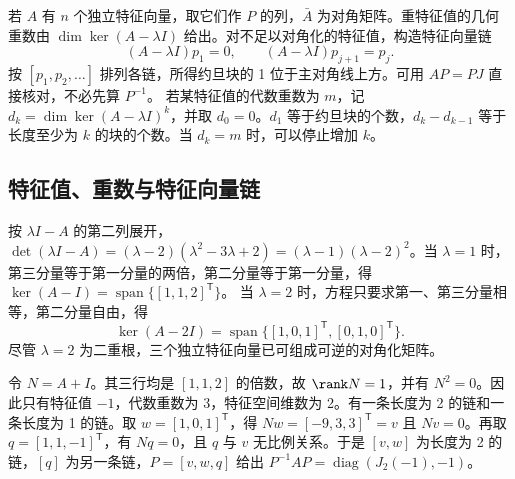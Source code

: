 
若 $A$ 有 $n$ 个独立特征向量，取它们作 $P$ 的列，$\bar A$ 为对角矩阵。重特征值的几何重数由 $\dim\ker(A-\lambda I)$ 给出。对不足以对角化的特征值，构造特征向量链
\[
(A-\lambda I)p_1=0,\qquad
(A-\lambda I)p_{j+1}=p_j.
\]
按 $[p_1,p_2,\ldots]$ 排列各链，所得约旦块的 1 位于主对角线上方。可用 $AP=PJ$ 直接核对，不必先算 $P^{-1}$。
若某特征值的代数重数为 $m$，记 $d_k=\dim\ker(A-\lambda I)^k$，并取 $d_0=0$。$d_1$ 等于约旦块的个数，$d_k-d_{k-1}$ 等于长度至少为 $k$ 的块的个数。当 $d_k=m$ 时，可以停止增加 $k$。

\subsection{特征值、重数与特征向量链}



\sol 按 $\lambda I-A$ 的第二列展开，$\det(\lambda I-A)=(\lambda-2)(\lambda^2-3\lambda+2)=(\lambda-1)(\lambda-2)^2$。当 $\lambda=1$ 时，第三分量等于第一分量的两倍，第二分量等于第一分量，得 $\ker(A-I)=\operatorname{span}\{[1,1,2]^{\mathsf T}\}$。
当 $\lambda=2$ 时，方程只要求第一、第三分量相等，第二分量自由，得
\[
\ker(A-2I)=\operatorname{span}\bigl\{[1,0,1]^{\mathsf T},[0,1,0]^{\mathsf T}\bigr\}.
\]
尽管 $\lambda=2$ 为二重根，三个独立特征向量已可组成可逆的对角化矩阵。



\sol 令 $N=A+I$。其三行均是 $[1,1,2]$ 的倍数，故 $\rank N=1$，并有 $N^2=0$。因此只有特征值 $-1$，代数重数为 3，特征空间维数为 2。有一条长度为 2 的链和一条长度为 1 的链。取 $w=[1,0,1]^{\mathsf T}$，得 $Nw=[-9,3,3]^{\mathsf T}=v$ 且 $Nv=0$。再取 $q=[1,1,-1]^{\mathsf T}$，有 $Nq=0$，且 $q$ 与 $v$ 无比例关系。于是 $[v,w]$ 为长度为 2 的链，$[q]$ 为另一条链，$P=[v,w,q]$ 给出 $P^{-1}AP=\operatorname{diag}(J_2(-1),-1)$。

